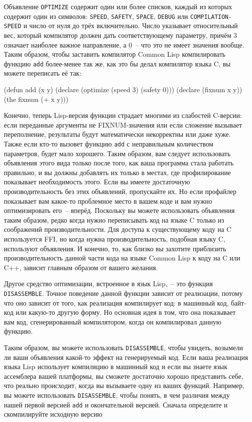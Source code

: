 Объявление \lstinline{OPTIMIZE} содержит один или более списков, каждый из которых содержит
один из символов: \lstinline{SPEED}, \lstinline{SAFETY}, \lstinline{SPACE}, \lstinline{DEBUG} или
\lstinline{COMPILATION-SPEED} и число от нуля до трёх включительно. Число указывает
относительный вес, который компилятор должен дать соответствующему параметру, причём 3
означает наиболее важное направление, а 0~-- что это не имеет значения вообще. Таким
образом, чтобы заставить компилятор Common Lisp компилировать функцию \lstinline{add}
более-менее так же, как это бы делал компилятор языка C, вы можете переписать её так:

\begin{myverb}
(defun add (x y)
  (declare (optimize (speed 3) (safety 0)))
  (declare (fixnum x y))
  (the fixnum (+ x y)))
\end{myverb}

Конечно, теперь Lisp-версия функции страдает многими из слабостей C-версии: если
переданные аргументы не FIXNUM-значения или если сложение вызывает переполнение,
результаты будут математически некорректны или даже хуже. Также если кто-то вызовет
функцию \lstinline{add} с неправильным количеством параметров, будет мало хорошего. Таким
образом, вам следует использовать объявления этого вида только после того, как ваша
программа стала работать правильно, и вы должны добавлять их только в местах, где
профилирование показывает необходимость этого. Если вы имеете достаточную
производительность без этих объявлений, пропускайте их. Но если профайлер показывает вам
какое-то проблемное место в вашем коде и вам нужно оптимизировать его~-- вперёд. Поскольку
вы можете использовать объявления таким образом, редко ког\-да нужно переписывать код на
языке C только из соображений производительности. Для доступа к существующему коду на C
используется FFI, но когда нужна производительность, подобная языку C, используют
объявления. И конечно, то, как близко вы захотите приблизить производительность данной
части кода на языке Common Lisp к коду на C или C++, зависит главным образом от вашего
желания.

Другое средство оптимизации, встроенное в язык Lisp,~-- это функция
\lstinline{DISASSEMBLE}. Точное поведение данной функции зависит от реализации, потому что оно
зависит от того, как реализация компилирует код: в машинный код, байт-код или какую-то
другую форму. Но основная идея в том, что она показывает вам код, сгенерированный
компилятором, когда он компилировал данную функцию.

Таким образом, вы можете использовать \lstinline{DISASSEMBLE}, чтобы увидеть, возымели ли ваши
объявления какой-то эффект на генерируемый код. Если ваша реализация языка Lisp использует
компиляцию в машинный код и если вы знаете язык ассемблера вашей платформы, вы сможете
достаточно хорошо представить себе, что реально происходит, когда вы вызываете одну из
ваших функций. Например, вы можете использовать \lstinline{DISASSEMBLE}, чтобы понять, в чем
различия между нашей первой версией \lstinline{add} и окончательной версией. Сначала определите
и скомпилируйте исходную версию

